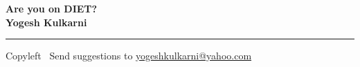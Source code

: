 
\graphicspath{{images/}}

\footnotesize


\begin{center}
\Large{\textbf{Are you on DIET?\\Yogesh Kulkarni}}  
\end{center}

\begin{multicols}{2}

\end{multicols}

\rule{\linewidth}{0.25pt}
\scriptsize
Copyleft \textcopyleft\  Send suggestions to 
\href{http://www.yogeshkulkarni.com}{yogeshkulkarni@yahoo.com}


